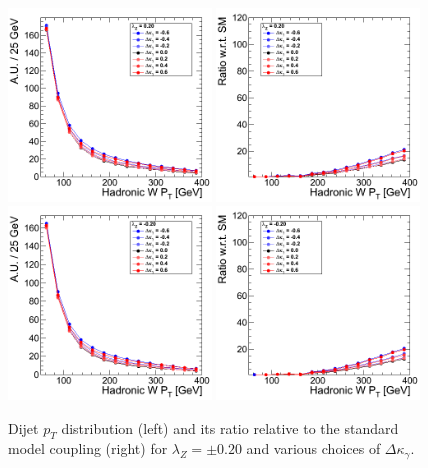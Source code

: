 \begin{figure}[h!t]
  {\centering
    \includegraphics[width=0.48\textwidth]{figs/HadronicWpT_020.png}
    \includegraphics[width=0.48\textwidth]{figs/HadronicWpT_020_ratio.png}
    \includegraphics[width=0.48\textwidth]{figs/HadronicWpT_m020.png}
    \includegraphics[width=0.48\textwidth]{figs/HadronicWpT_m020_ratio.png}
    \caption{Dijet $p_T$ distribution (left) and its ratio relative to 
    the standard model coupling (right) for $\lambda_Z = \pm 0.20$ and various choices of $\Delta{\kappa_\gamma}$.}
    \label{fig:ww_dijetPt_atgcRatio020}}
\end{figure}
